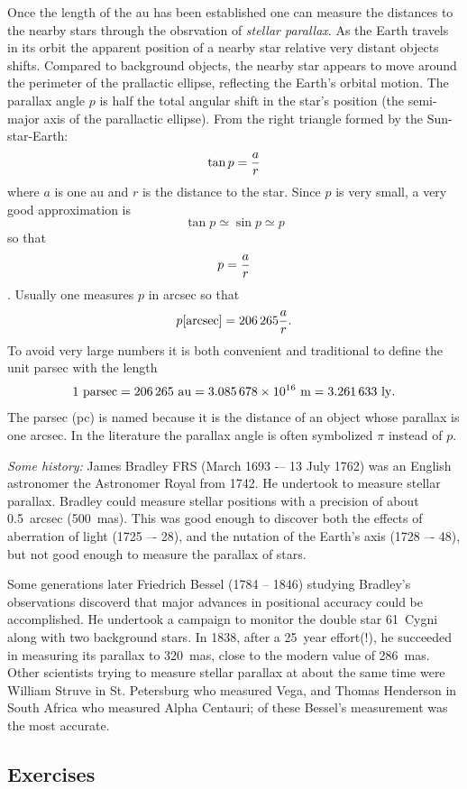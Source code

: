Once the length of the au has been established one can measure the distances to the nearby stars
through the obsrvation of {\it stellar parallax}. As the Earth travels in its orbit the apparent
position of a nearby star relative very distant objects shifts. Compared to background objects,
the nearby star appears to move around the perimeter of the prallactic ellipse, reflecting the 
Earth's orbital motion. The parallax angle $p$ is half the total angular shift in the star's
position (the semi-major axis of the parallactic ellipse). From the right triangle formed by the
Sun-star-Earth:
\[ \tan p={a\over r} \]
where $a$ is one au and $r$ is the distance to the star. Since $p$ is very small, a very good 
approximation is \[\tan p\simeq\sin p\simeq p\] so that \[ p={a\over r}\]. Usually one measures
$p$ in arcsec so that 
\[ p[{\rm arcsec}]=206\,265{a\over r}. \]
To avoid very large numbers it is both convenient and traditional to define the unit parsec with 
the length
\[ 1~{\rm parsec}=206\,265~{\rm au}=3.085\,678\times 10^{16}~{\rm m}=3.261\,633~{\rm ly}. \]
The parsec (pc) is named because it is the distance of an object whose parallax is one arcsec. 
In the literature the parallax angle is often symbolized $\pi$ instead of $p$.

{\it Some history:} James Bradley FRS (March 1693 -– 13 July 1762) was an English astronomer the Astronomer Royal from 1742. He undertook to measure stellar parallax. Bradley could measure stellar positions with a precision of about 0.5~arcsec (500~mas). This was good enough to
discover both the effects of aberration of light (1725 –- 28), and the nutation of the Earth's axis (1728 –- 48), but not good enough to measure the parallax of stars.

Some generations later Friedrich Bessel (1784 -- 1846) studying Bradley's observations discoverd
that major advances in positional accuracy could be accomplished. He undertook a campaign to
monitor the double star 61~Cygni along with two background stars. In 1838, after a 25~year effort(!), he succeeded in measuring its parallax to 320~mas, close to the modern value of 
286~mas. Other scientists trying to measure stellar parallax at about the same time were
William Struve in St. Petersburg who measured Vega, and Thomas Henderson in South Africa who measured Alpha Centauri; of these Bessel's measurement was the most accurate.

\subsection*{Exercises}

